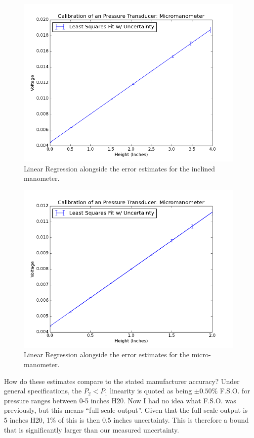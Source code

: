\documentclass{article}
\begin{document}
\begin{figure}[!htb]
  \begin{center}
    \includegraphics[width = 12 cm]{figs/incl-error.png}
    \caption{Linear Regression alongside the error estimates for the inclined manometer. }
    \label{error-incl}
  \end{center}
\end{figure}

\begin{figure}[!htb]
  \begin{center}
    \includegraphics[width = 12 cm]{figs/micro-error.png}
    \caption{Linear Regression alongside the error estimates for the micro-manometer. }
    \label{error-micro}
  \end{center}
\end{figure}

How do these estimates compare to the stated manufacturer accuracy? 
Under general specifications, the $P_2 < P_1$ linearity is quoted as being $\pm 0.50\%$ F.S.O.  
for pressure ranges between 0-5 inches H20. Now I had no idea what F.S.O. was previously, but this 
means ``full scale output''. Given that the full scale output is 5 inches H20, 1\% of this is then 
0.5 inches uncertainty. This is therefore a bound that is significantly larger than our measured uncertainty. 
\end{document}
